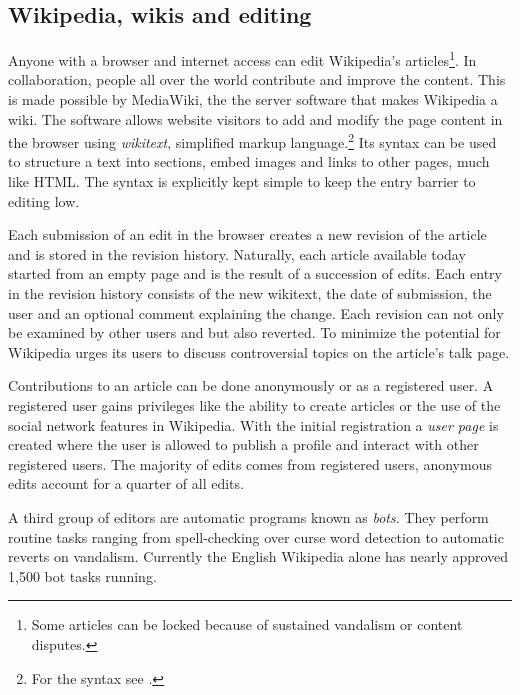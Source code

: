 \subsection{Wikipedia, wikis and editing}

Anyone with a browser and internet access can edit Wikipedia's articles\footnote{Some articles can be locked because of sustained vandalism or content disputes.\cite{wpprotectionpolicy}}.
In collaboration, people all over the world contribute and improve the content. 
This is made possible by MediaWiki, the the server software that makes Wikipedia a wiki. 
The software allows website visitors to add and modify the page content in the browser using \emph{wikitext}, simplified markup language.\footnote{For the syntax see .}
Its syntax can be used to structure a text into sections, embed images and links to other pages, much like HTML.
The syntax is explicitly kept simple to keep the entry barrier to editing low.

Each submission of an edit in the browser creates a new revision of the article and is stored in the revision history.
Naturally, each article available today started from an empty page and is the result of a succession of edits.
Each entry in the revision history consists of the new wikitext, the date of submission, the user and an optional comment explaining the change.
Each revision can not only be examined by other users and but also reverted.
To minimize the potential for \cite{suh2007us} Wikipedia urges its users to discuss controversial topics on the article's talk page.


Contributions to an article can be done anonymously or as a registered user.
A registered user gains privileges like the ability to create articles or the use of the social network features in Wikipedia.
With the initial registration a \emph{user page} is created where the user is allowed to publish a profile and interact with other registered users.\cite{wikiwhyaccount}
The majority of edits comes from registered users, anonymous edits account for a quarter of all edits.\cite{wpanonstats}

A third group of editors are automatic programs known as \emph{bots}.
They perform routine tasks ranging from spell-checking over curse word detection to automatic reverts on vandalism.
Currently the English Wikipedia alone has nearly approved 1,500 bot tasks running.\cite{wpbots}

